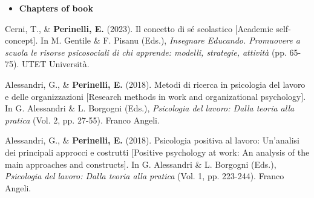 \documentclass[hidelinks, letterpaper,10pt]{article} %
\begin{document}
\begin{itemize}
	\setlength{\topsep}{0pt}%
	\setlength{\leftmargin}{0.1in}%
	\setlength{\listparindent}{-0.1in}%
	\setlength{\itemindent}{-0.2in}%
	\setlength{\parsep}{\parskip}%
	
	\item {\textbf{\large{Chapters of book}}}
\end{itemize}
\begin{etaremune}
    \item Cerni, T., \& \textbf{Perinelli, E.} (2023). Il concetto di sé scolastico [Academic self-concept]. In M. Gentile \& F. Pisanu (Eds.), \textit{Insegnare Educando. Promuovere a scuola le risorse psicosociali di chi apprende: modelli, strategie, attività} (pp. 65-75). UTET Università.
    
	\item Alessandri, G., \& \textbf{Perinelli, E.} (2018). Metodi di ricerca in psicologia del lavoro e delle organizzazioni [Research methods in work and organizational psychology]. In G. Alessandri \& L. Borgogni (Eds.), \textit{Psicologia del lavoro: Dalla teoria alla pratica} (Vol. 2, pp. 27-55). Franco Angeli.

    \item Alessandri, G., \& \textbf{Perinelli, E.} (2018). Psicologia positiva al lavoro: Un’analisi dei principali approcci e costrutti [Positive psychology at work: An analysis of the main approaches and constructs]. In G. Alessandri \& L. Borgogni (Eds.), \textit{Psicologia del lavoro: Dalla teoria alla pratica} (Vol. 1, pp. 223-244). Franco Angeli.
\end{etaremune}
\vspace{3mm}
\end{document}
